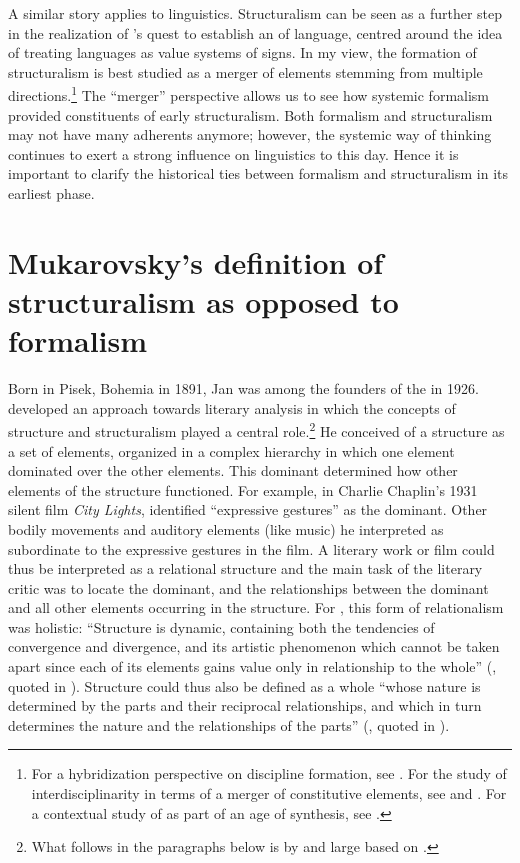 \documentclass[output=paper]{langscibook}
\begin{document}
A similar story applies to linguistics.  Structuralism can be seen as a further step in the realization of {\Saussure}'s quest to establish an  of language, centred around the idea of treating languages as value systems of signs. In my view, the formation of structuralism is best studied as a merger of elements stemming from multiple directions.\footnote{For a hybridization perspective on discipline formation, see \citet{Karstens2012}. For the study of interdisciplinarity in terms of a merger of constitutive elements, see \citet{Graff2015} and \citet{Bod2019}. For a contextual study of {\Jakobson} as part of an age of synthesis, see \citet{Karstens2017lonely}.} The ``merger'' perspective allows us to see how systemic formalism provided constituents of early structuralism. Both formalism and structuralism may not have many adherents anymore; however, the systemic way of thinking continues to exert a strong influence on linguistics to this day. Hence it is important to clarify the historical ties between formalism and structuralism in its earliest phase.

\section{Mukarovsky's definition of structuralism as opposed to formalism}
\label{sec:karstens:mukarovsky}

Born in Pisek, Bohemia in 1891, Jan {\Mukarovsky} was among the founders of the {\PragueLinguisticCircle} in 1926. {\Mukarovsky} developed an approach towards literary analysis in which the concepts of structure and structuralism played a central role.\footnote{What follows in the paragraphs below is by and large based on \citet[22--44]{Galan1985}.} He conceived of a structure as a set of elements, organized in a complex hierarchy in which one element dominated over the other elements. This dominant determined how other elements of the structure functioned. For example, in Charlie Chaplin's 1931 silent film \emph{City Lights}, {\Mukarovsky} identified ``expressive gestures'' as the dominant. Other bodily movements and auditory elements (like music) he interpreted as subordinate to the expressive gestures in the film. A literary work or film could thus be interpreted as a relational structure and the main task of the literary critic was to locate the dominant, and the relationships between the dominant and all other elements occurring in the structure. For {\Mukarovsky}, this form of relationalism was holistic: ``Structure is dynamic, containing both the tendencies of convergence and divergence, and its artistic phenomenon which cannot be taken apart since each of its elements gains value only in relationship to the whole'' ({\Mukarovsky}, quoted in \citealt[30]{Galan1985}). Structure could thus also be defined as a whole ``whose nature is determined by the parts and their reciprocal relationships, and which in turn determines the nature and the relationships of the parts'' ({\Mukarovsky}, quoted in \citealt[35]{Galan1985}).
\end{document}
